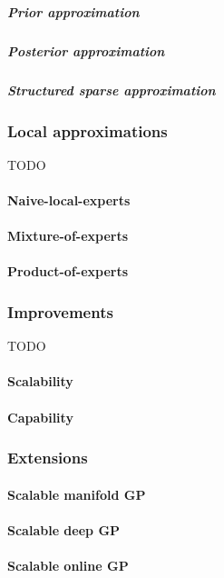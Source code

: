 \documentclass[10pt]{article}
\begin{document}
\subparagraph{Prior approximation}
\subparagraph{Posterior approximation}
\subparagraph{Structured sparse approximation}


\subsubsection{Local approximations}
TODO

\paragraph{Naive-local-experts}

\paragraph{Mixture-of-experts}

\paragraph{Product-of-experts}


\subsubsection{Improvements}
TODO

\paragraph{Scalability}

\paragraph{Capability}


\subsubsection{Extensions}

\paragraph{Scalable manifold GP}

\paragraph{Scalable deep GP}

\paragraph{Scalable online GP}
\end{document}
